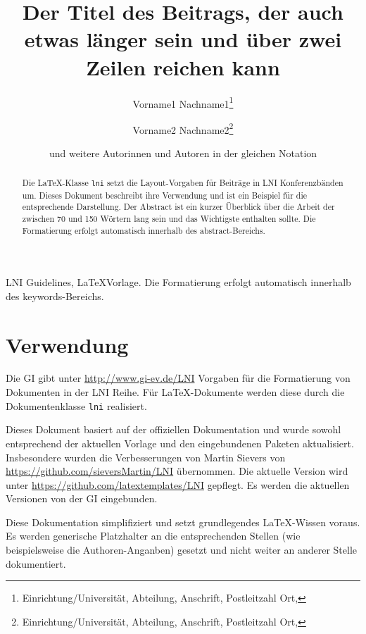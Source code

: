\documentclass[english,utf8]{lni}
\author[Vorname1 Nachname1 \and Vorname2 Nachname2]{
Vorname1 Nachname1\footnote{Einrichtung/Universität, Abteilung, Anschrift, Postleitzahl Ort, \email{emailadresse@author1}} \and
Vorname2 Nachname2\footnote{Einrichtung/Universität, Abteilung, Anschrift, Postleitzahl Ort, \email{emailadresse@author2}} \and
und weitere Autorinnen und Autoren in der gleichen Notation}
\title[Kurztitel für die Kopfzeile]{Der Titel des Beitrags, der auch etwas länger sein und über zwei Zeilen reichen kann}
\begin{document}
\maketitle

\setcounter{footnote}{2}

\begin{abstract}
Die \LaTeX-Klasse \texttt{lni} setzt die Layout-Vorgaben für Beiträge in LNI Konferenzbänden um.
Dieses Dokument beschreibt ihre Verwendung und ist ein Beispiel für die entsprechende Darstellung.
Der Abstract ist ein kurzer Überblick über die Arbeit der zwischen 70 und 150 Wörtern lang sein und das Wichtigste enthalten sollte.
Die Formatierung erfolgt automatisch innerhalb des abstract-Bereichs.
\end{abstract}

\begin{keywords}
LNI Guidelines, \LaTeX Vorlage. Die Formatierung erfolgt automatisch innerhalb des keywords-Bereichs.
\end{keywords}

\section{Verwendung}
Die GI gibt unter \url{http://www.gi-ev.de/LNI} Vorgaben für die Formatierung von Dokumenten in der LNI Reihe.
Für \LaTeX-Dokumente werden diese durch die Dokumentenklasse \texttt{lni} realisiert.

Dieses Dokument basiert auf der offiziellen Dokumentation und wurde sowohl entsprechend der aktuellen Vorlage und den eingebundenen Paketen aktualisiert.
Insbesondere wurden die Verbesserungen von Martin Sievers von \url{https://github.com/sieversMartin/LNI} übernommen.
Die aktuelle Version wird unter \url{https://github.com/latextemplates/LNI} gepflegt.
Es werden die aktuellen Versionen von der GI eingebunden.

Diese Dokumentation simplifiziert und setzt grundlegendes LaTeX-Wissen voraus.
Es werden generische Platzhalter an die entsprechenden Stellen (wie beispielsweise die Authoren-Anganben) gesetzt und nicht weiter an anderer Stelle dokumentiert.
\end{document}
